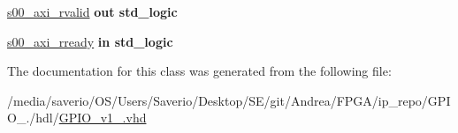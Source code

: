 \begin{DoxyCompactItemize}
\item 
\mbox{\label{classGPIO__v1__0_af180911f7eb262e530e26865bc97aa0b}} 
\hyperlink{classGPIO__v1__0_af180911f7eb262e530e26865bc97aa0b}{s00\+\_\+axi\+\_\+rvalid}  {\bfseries {\bfseries \textcolor{vhdlchar}{out}\textcolor{vhdlchar}{ }}} {\bfseries \textcolor{vhdlchar}{std\+\_\+logic}\textcolor{vhdlchar}{ }} 
\item 
\mbox{\label{classGPIO__v1__0_a8b82eb165d7024f6c7b25646f6ebdd4d}} 
\hyperlink{classGPIO__v1__0_a8b82eb165d7024f6c7b25646f6ebdd4d}{s00\+\_\+axi\+\_\+rready}  {\bfseries {\bfseries \textcolor{vhdlchar}{in}\textcolor{vhdlchar}{ }}} {\bfseries \textcolor{vhdlchar}{std\+\_\+logic}\textcolor{vhdlchar}{ }} 
\end{DoxyCompactItemize}


The documentation for this class was generated from the following file\+:\begin{DoxyCompactItemize}
\item 
/media/saverio/\+O\+S/\+Users/\+Saverio/\+Desktop/\+S\+E/git/\+Andrea/\+F\+P\+G\+A/ip\+\_\+repo/\+G\+P\+I\+O\+\_./hdl/\hyperlink{GPIO__v1__0_8vhd}{G\+P\+I\+O\+\_\+v1\+\_.\+vhd}\end{DoxyCompactItemize}
